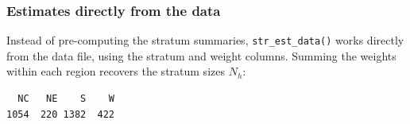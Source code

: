 \documentclass[
  letterpaper,
  DIV=11,
  numbers=noendperiod]{scrreprt}
\newenvironment{Shaded}{\begin{snugshade}}{\end{snugshade}}
\newcommand{\AttributeTok}[1]{\textcolor[rgb]{0.40,0.45,0.13}{#1}}
\newcommand{\DocumentationTok}[1]{\textcolor[rgb]{0.37,0.37,0.37}{\textit{#1}}}
\newcommand{\FunctionTok}[1]{\textcolor[rgb]{0.28,0.35,0.67}{#1}}
\newcommand{\NormalTok}[1]{\textcolor[rgb]{0.00,0.23,0.31}{#1}}
\newcommand{\OtherTok}[1]{\textcolor[rgb]{0.00,0.23,0.31}{#1}}
\newcommand{\SpecialCharTok}[1]{\textcolor[rgb]{0.37,0.37,0.37}{#1}}
\newcommand{\StringTok}[1]{\textcolor[rgb]{0.13,0.47,0.30}{#1}}
\renewcommand{\[}{\begin{equation}}
\renewcommand{\]}{\end{equation}}
\begin{document}
\subsubsection*{Estimates directly from the
data}\label{estimates-directly-from-the-data}

Instead of pre-computing the stratum summaries,
\texttt{str\_est\_data()} works directly from the data file, using the
stratum and weight columns. Summing the weights within each region
recovers the stratum sizes \(N_h\):

\begin{Shaded}
\end{Shaded}

\begin{verbatim}
  NC   NE    S    W 
1054  220 1382  422 
\end{verbatim}

\begin{Shaded}
\end{Shaded}
\end{document}
